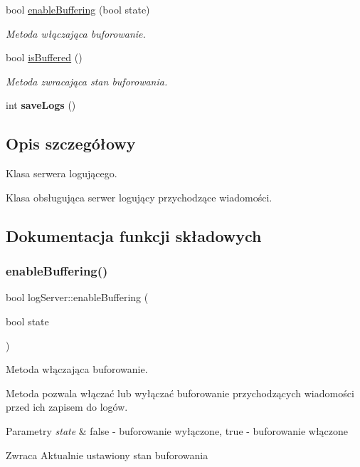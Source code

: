\begin{DoxyCompactItemize}
bool \hyperlink{classlog_server_abce2355c2c8d6589a172f57c4f439d99}{enable\+Buffering} (bool state)
\begin{DoxyCompactList}\small\item\em Metoda włączająca buforowanie. \end{DoxyCompactList}\item 
bool \hyperlink{classlog_server_a776ab033d6fe36605b9655da4ecfd56f}{is\+Buffered} ()
\begin{DoxyCompactList}\small\item\em Metoda zwracająca stan buforowania. \end{DoxyCompactList}\item 
\mbox{\label{classlog_server_ac7b78a08896e80845e3966a78997da76}} 
int {\bfseries save\+Logs} ()
\end{DoxyCompactItemize}


\subsection{Opis szczegółowy}
Klasa serwera logującego. 

Klasa obsługująca serwer logujący przychodzące wiadomości. 

\subsection{Dokumentacja funkcji składowych}
\mbox{\label{classlog_server_abce2355c2c8d6589a172f57c4f439d99}} 
\subsubsection{\texorpdfstring{enable\+Buffering()}{enableBuffering()}}
{\footnotesize\ttfamily bool log\+Server\+::enable\+Buffering (\begin{DoxyParamCaption}\item[{bool}]{state }\end{DoxyParamCaption})}



Metoda włączająca buforowanie. 

Metoda pozwala włączać lub wyłączać buforowanie przychodzących wiadomości przed ich zapisem do logów.


\begin{DoxyParams}{Parametry}
{\em state} & false -\/ buforowanie wyłączone, true -\/ buforowanie włączone \\
\hline
\end{DoxyParams}
\begin{DoxyReturn}{Zwraca}
Aktualnie ustawiony stan buforowania 
\end{DoxyReturn}
\mbox{\label{classlog_server_a776ab033d6fe36605b9655da4ecfd56f}} 

